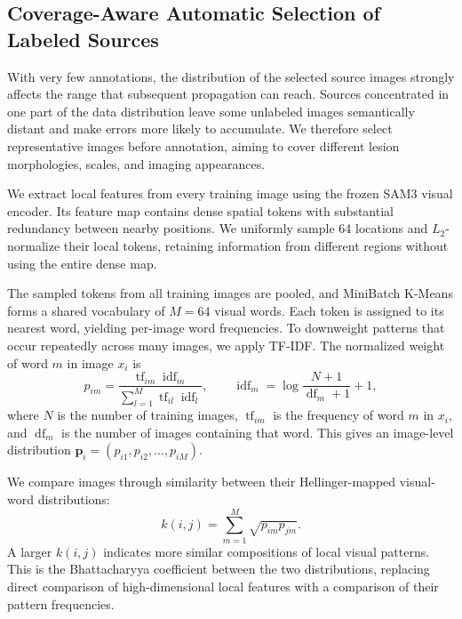 \documentclass[a4paper,fleqn]{cas-dc}
\begin{document}
\subsection{Coverage-Aware Automatic Selection of Labeled Sources}
\label{sec:support-selection}

With very few annotations, the distribution of the selected source images strongly affects the range that subsequent propagation can reach. Sources concentrated in one part of the data distribution leave some unlabeled images semantically distant and make errors more likely to accumulate. We therefore select representative images before annotation, aiming to cover different lesion morphologies, scales, and imaging appearances.

We extract local features from every training image using the frozen SAM3 visual encoder. Its feature map contains dense spatial tokens with substantial redundancy between nearby positions. We uniformly sample 64 locations and $L_2$-normalize their local tokens, retaining information from different regions without using the entire dense map.

The sampled tokens from all training images are pooled, and MiniBatch K-Means forms a shared vocabulary of $M=64$ visual words. Each token is assigned to its nearest word, yielding per-image word frequencies. To downweight patterns that occur repeatedly across many images, we apply TF-IDF. The normalized weight of word $m$ in image $x_i$ is
\begin{equation}
p_{im}=
\frac{\operatorname{tf}_{im}\operatorname{idf}_{m}}
{\sum_{l=1}^{M}\operatorname{tf}_{il}\operatorname{idf}_{l}},
\qquad
\operatorname{idf}_{m}=
\log\frac{N+1}{\operatorname{df}_{m}+1}+1,
\end{equation}
where $N$ is the number of training images, $\operatorname{tf}_{im}$ is the frequency of word $m$ in $x_i$, and $\operatorname{df}_{m}$ is the number of images containing that word. This gives an image-level distribution $\mathbf{p}_i=(p_{i1},p_{i2},\ldots,p_{iM})$.

We compare images through similarity between their Hellinger-mapped visual-word distributions:
\begin{equation}
k(i,j)=\sum_{m=1}^{M}\sqrt{p_{im}p_{jm}}.
\end{equation}
A larger $k(i,j)$ indicates more similar compositions of local visual patterns. This is the Bhattacharyya coefficient between the two distributions, replacing direct comparison of high-dimensional local features with a comparison of their pattern frequencies.
\end{document}
